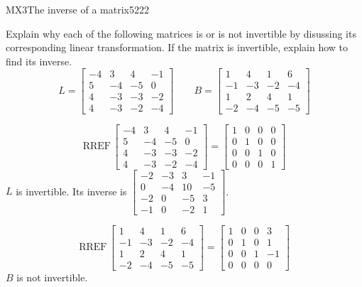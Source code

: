 \begin{exercise}{MX3}{The inverse of a matrix}{5222} 
\begin{exerciseStatement} 

 Explain why each of the following matrices is or is not invertible by disussing its corresponding linear transformation. If the matrix is invertible, explain how to find its inverse. \[
\hspace{2em}
L = \left[\begin{array}{cccc}
-4 & 3 & 4 & -1 \\
5 & -4 & -5 & 0 \\
4 & -3 & -3 & -2 \\
4 & -3 & -2 & -4
\end{array}\right]
\hspace{2em}
B = \left[\begin{array}{cccc}
1 & 4 & 1 & 6 \\
-1 & -3 & -2 & -4 \\
1 & 2 & 4 & 1 \\
-2 & -4 & -5 & -5
\end{array}\right]
\hspace{2em}
        \] 

 \end{exerciseStatement}
 \begin{exerciseAnswer} 

 \[\mathrm{RREF}\,\left[\begin{array}{cccc}
-4 & 3 & 4 & -1 \\
5 & -4 & -5 & 0 \\
4 & -3 & -3 & -2 \\
4 & -3 & -2 & -4
\end{array}\right]=\left[\begin{array}{cccc}
1 & 0 & 0 & 0 \\
0 & 1 & 0 & 0 \\
0 & 0 & 1 & 0 \\
0 & 0 & 0 & 1
\end{array}\right]\] \(L\) is invertible. Its inverse is \(\left[\begin{array}{cccc}
-2 & -3 & 3 & -1 \\
0 & -4 & 10 & -5 \\
-2 & 0 & -5 & 3 \\
-1 & 0 & -2 & 1
\end{array}\right]\). 

 

 \[\mathrm{RREF}\,\left[\begin{array}{cccc}
1 & 4 & 1 & 6 \\
-1 & -3 & -2 & -4 \\
1 & 2 & 4 & 1 \\
-2 & -4 & -5 & -5
\end{array}\right]=\left[\begin{array}{cccc}
1 & 0 & 0 & 3 \\
0 & 1 & 0 & 1 \\
0 & 0 & 1 & -1 \\
0 & 0 & 0 & 0
\end{array}\right]\] \(B\) is not invertible. 

 \end{exerciseAnswer}
 \end{exercise}


